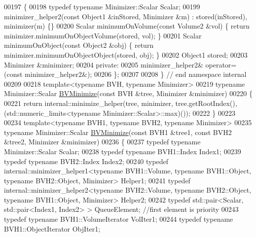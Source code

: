 \begin{DoxyCode}
00197 \{
00198   \textcolor{keyword}{typedef} \textcolor{keyword}{typename} Minimizer::Scalar Scalar;
00199   minimizer\_helper2(\textcolor{keyword}{const} Object1 &inStored, Minimizer &m) : stored(inStored), minimizer(m) \{\}
00200   Scalar minimumOnVolume(\textcolor{keyword}{const} Volume2 &vol) \{ \textcolor{keywordflow}{return} minimizer.minimumOnObjectVolume(stored, vol); \}
00201   Scalar minimumOnObject(\textcolor{keyword}{const} Object2 &obj) \{ \textcolor{keywordflow}{return} minimizer.minimumOnObjectObject(stored, obj); \}
00202   Object1 stored;
00203   Minimizer &minimizer;
00204 \textcolor{keyword}{private}:
00205   minimizer\_helper2& operator=(\textcolor{keyword}{const} minimizer\_helper2&);
00206 \};
00207 
00208 \} \textcolor{comment}{// end namespace internal}
00209 
00218 \textcolor{keyword}{template}<\textcolor{keyword}{typename} BVH, \textcolor{keyword}{typename} Minimizer>
00219 \textcolor{keyword}{typename} Minimizer::Scalar \hyperlink{namespace_eigen_adcbe73ac1482eacab0e18ee32c25508e}{BVMinimize}(\textcolor{keyword}{const} BVH &tree, Minimizer &minimizer)
00220 \{
00221   \textcolor{keywordflow}{return} internal::minimize\_helper(tree, minimizer, tree.getRootIndex(), (std::numeric\_limits<typename
       Minimizer::Scalar>::max)());
00222 \}
00223 
00234 \textcolor{keyword}{template}<\textcolor{keyword}{typename} BVH1, \textcolor{keyword}{typename} BVH2, \textcolor{keyword}{typename} Minimizer>
00235 \textcolor{keyword}{typename} Minimizer::Scalar \hyperlink{namespace_eigen_adcbe73ac1482eacab0e18ee32c25508e}{BVMinimize}(\textcolor{keyword}{const} BVH1 &tree1, \textcolor{keyword}{const} BVH2 &tree2, Minimizer &minimizer)
00236 \{
00237   \textcolor{keyword}{typedef} \textcolor{keyword}{typename} Minimizer::Scalar Scalar;
00238   \textcolor{keyword}{typedef} \textcolor{keyword}{typename} BVH1::Index Index1;
00239   \textcolor{keyword}{typedef} \textcolor{keyword}{typename} BVH2::Index Index2;
00240   \textcolor{keyword}{typedef} internal::minimizer\_helper1<typename BVH1::Volume, typename BVH1::Object, typename BVH2::Object,
       Minimizer> Helper1;
00241   \textcolor{keyword}{typedef} internal::minimizer\_helper2<typename BVH2::Volume, typename BVH2::Object, typename BVH1::Object,
       Minimizer> Helper2;
00242   \textcolor{keyword}{typedef} std::pair<Scalar, std::pair<Index1, Index2> > QueueElement; \textcolor{comment}{//first element is priority}
00243   \textcolor{keyword}{typedef} \textcolor{keyword}{typename} BVH1::VolumeIterator VolIter1;
00244   \textcolor{keyword}{typedef} \textcolor{keyword}{typename} BVH1::ObjectIterator ObjIter1;

\end{DoxyCode}
